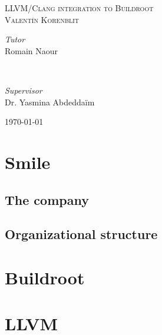 \documentclass[12pt,a4paper,oneside]{article}
\begin{document}
\begin{titlepage}
	\textsc{\Large LLVM/Clang integration to Buildroot}\\[1cm]

	\textsc{\large Valent\'{i}n Korenblit}\\[1cm]

	\begin{minipage}{0.4\textwidth}
		\begin{flushleft}
			\large
			\textit{Tutor}\\
			Romain Naour %
		\end{flushleft}
	\end{minipage}
	~
	\begin{minipage}{0.4\textwidth}
		\begin{flushright}
			\large
			\textit{Supervisor}\\
			Dr. Yasmina Abdedda\"{i}m %
		\end{flushright}
	\end{minipage}

	\vfill\vfill\vfill %

	{\large\today} %

	\vfill %

\end{titlepage}

\begin{abstract}

\end{abstract}
\newpage

\tableofcontents
\newpage

\section{Smile}

\subsection{The company}
\subsection{Organizational structure}

\section{Buildroot}

\section{LLVM}
\end{document}
